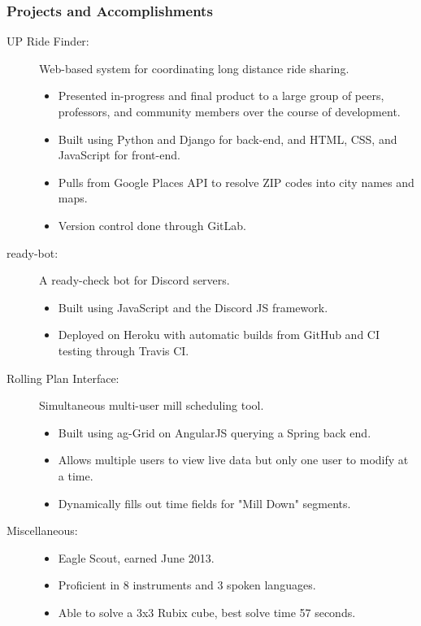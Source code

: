 \documentclass{article}
\begin{document}
\subsubsection*{Projects and Accomplishments}
    \begin{description}
        \item[UP Ride Finder:] Web-based system for coordinating long distance ride sharing.
            \begin{itemize}
                \item Presented in-progress and final product to a large group of peers, professors, and community members over the course of development.
                \item Built using Python and Django for back-end, and HTML, CSS, and JavaScript for front-end.
                \item Pulls from Google Places API to resolve ZIP codes into city names and maps.
                \item Version control done through GitLab.
            \end{itemize}

            \vspace{0.5em}

        \item[ready-bot:] A ready-check bot for Discord servers.
            \begin{itemize}
                \item Built using JavaScript and the Discord JS framework.
                \item Deployed on Heroku with automatic builds from GitHub and CI testing through Travis CI.
            \end{itemize}

            \vspace{0.5em}

        \item[Rolling Plan Interface:] Simultaneous multi-user mill scheduling tool.
            \begin{itemize}
                \item Built using ag-Grid on AngularJS querying a Spring back end.
                \item Allows multiple users to view live data but only one user to modify at a time.
                \item Dynamically fills out time fields for "Mill Down" segments.
            \end{itemize}

            \vspace{0.5em}

        \item[Miscellaneous:] \hfill
            \begin{itemize}
                \item Eagle Scout, earned June 2013.
                \item Proficient in 8 instruments and 3 spoken languages.
                \item Able to solve a 3x3 Rubix cube, best solve time 57 seconds.
        \end{itemize}
    \end{description}
\end{document}
